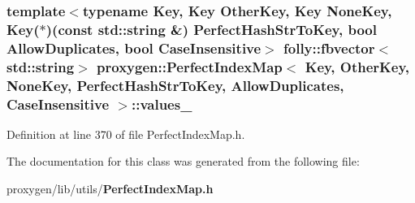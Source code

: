\subsubsection[{values\+\_\+}]{\setlength{\rightskip}{0pt plus 5cm}template$<$typename Key, Key Other\+Key, Key None\+Key, Key($\ast$)(const std\+::string \&) Perfect\+Hash\+Str\+To\+Key, bool Allow\+Duplicates, bool Case\+Insensitive$>$ folly\+::fbvector$<$std\+::string$>$ {\bf proxygen\+::\+Perfect\+Index\+Map}$<$ Key, Other\+Key, None\+Key, Perfect\+Hash\+Str\+To\+Key, Allow\+Duplicates, Case\+Insensitive $>$\+::values\+\_\+\hspace{0.3cm}{\ttfamily [private]}}\label{classproxygen_1_1PerfectIndexMap_a75a333bf26b05fe82fd1281cdd28534a}


Definition at line 370 of file Perfect\+Index\+Map.\+h.



The documentation for this class was generated from the following file\+:\begin{DoxyCompactItemize}
\item 
proxygen/lib/utils/{\bf Perfect\+Index\+Map.\+h}\end{DoxyCompactItemize}
